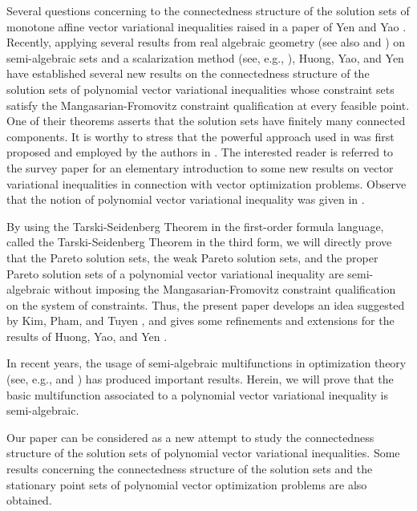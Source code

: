 \documentclass[]{interact}
\theoremstyle{plain}%
\theoremstyle{definition}
\begin{document}
Several questions concerning to the connectedness structure of the solution sets of monotone affine vector variational inequalities raised in a paper of Yen and Yao \cite{YY2011}.
Recently, applying several results from real algebraic geometry \cite{BCF98} (see also \cite{Coste02} and \cite{HaPham2016}) on semi-algebraic sets and a scalarization method (see, e.g., \cite{LKLY98}), Huong, Yao, and Yen \cite{HYY2015b} have established several new results on the connectedness structure of the solution sets of polynomial vector variational inequalities whose constraint sets satisfy the Mangasarian-Fromovitz constraint qualification \cite{Manga_Fro_1967} at every feasible point. One of their theorems asserts that the solution sets have finitely many connected components. It is worthy to stress that the powerful approach used in \cite{HYY2015b} was first proposed and employed by the authors in \cite{HYY2015a}. The interested reader is referred to the survey paper \cite{Yen2016} for an elementary introduction to some new results on vector variational inequalities in connection with vector optimization problems. Observe that the notion of polynomial vector variational inequality was given in \cite{HYY2015b}. 

By using the Tarski-Seidenberg Theorem in the first-order formula language, called the Tarski-Seidenberg Theorem in the third form, we will directly prove that the Pareto solution sets, the weak Pareto solution sets, and the proper Pareto solution sets of a polynomial vector variational inequality are semi-algebraic without imposing the Mangasarian-Fromovitz constraint qualification on the system of constraints. Thus, the present paper develops an idea suggested by Kim, Pham, and Tuyen \cite{KimPhamTuyen2016}, and gives some refinements and extensions for the results of Huong, Yao, and Yen  \cite{HYY2015b}. 

In recent years, the usage of semi-algebraic multifunctions in optimization theory (see, e.g., \cite{DP2011} and \cite{DL2013}) has produced important results. Herein, we will prove that the basic multifunction associated to a polynomial vector variational inequality is semi-algebraic. 

Our paper can be considered as a new attempt to study the connectedness structure of the solution sets of polynomial vector variational inequalities. Some results concerning the connectedness structure of the solution sets and the stationary point sets of polynomial vector optimization problems are also obtained.
\end{document}
